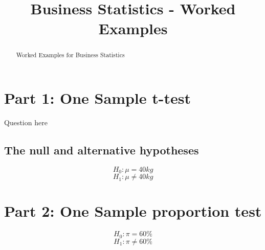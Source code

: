 \documentclass[12 pt]{report}
\title{Business Statistics - Worked Examples}
\author{}
\begin{document}
\maketitle

\begin{abstract}
Worked Examples for Business Statistics
\end{abstract}

\section*{Part 1: One Sample t-test}
Question here

\subsection*{The null and alternative hypotheses}
\[ H_0: \mu = 40 kg\]
\[ H_1: \mu \neq 40 kg\]

\section{Part 2: One Sample proportion test}
\[ H_0: \pi = 60\%\]
\[ H_1: \pi \neq 60\%\]
\end{document}

